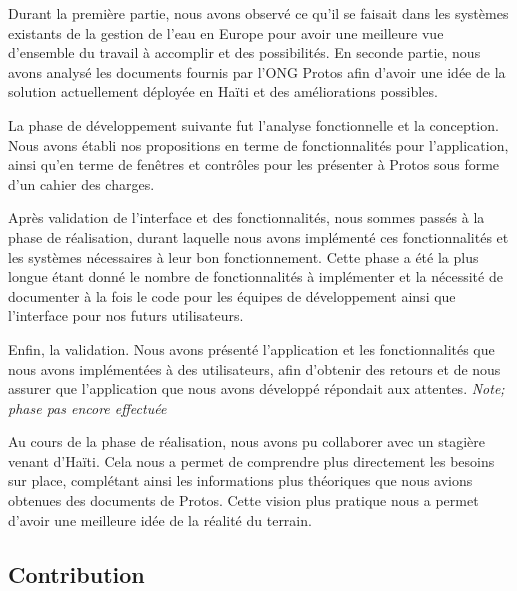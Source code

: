 \documentclass{eplmastersthesis_FR}
\begin{document}
			Durant la première partie, nous avons observé ce qu'il se faisait dans les systèmes existants de la gestion de l'eau en Europe pour avoir une meilleure vue d'ensemble du travail à accomplir et des possibilités. En seconde partie, nous avons analysé les documents fournis par l'ONG Protos afin d'avoir une idée de la solution actuellement déployée en Haïti et des améliorations possibles.

			La phase de développement suivante fut l'analyse fonctionnelle et la conception. Nous avons établi nos propositions en terme de fonctionnalités pour l'application, ainsi qu'en terme de fenêtres et contrôles pour les présenter à Protos sous forme d'un cahier des charges.

			Après validation de l'interface et des fonctionnalités, nous sommes passés à la phase de réalisation, durant laquelle nous avons implémenté ces fonctionnalités et les systèmes nécessaires à leur bon fonctionnement. Cette phase a été la plus longue étant donné le nombre de fonctionnalités à implémenter et la nécessité de documenter à la fois le code pour les équipes de développement ainsi que l'interface pour nos futurs utilisateurs.

			Enfin, la validation. Nous avons présenté l'application et les fonctionnalités que nous avons implémentées à des utilisateurs, afin d'obtenir des retours et de nous assurer que l'application que nous avons développé répondait aux attentes. \emph{Note; phase pas encore effectuée}

			Au cours de la phase de réalisation, nous avons pu collaborer avec un stagière venant d'Haïti. Cela nous a permet de comprendre plus directement les besoins sur place, complétant ainsi les informations plus théoriques que nous avions obtenues des documents de Protos. Cette vision plus pratique nous a permet d'avoir une meilleure idée de la réalité du terrain.

		\subsection*{Contribution}
\end{document}
